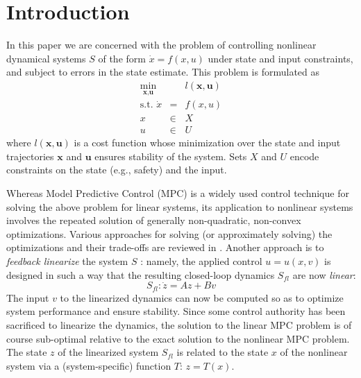 \section{Introduction}
\label{sec:intro}


In this paper we are concerned with the problem of controlling nonlinear dynamical systems $S$ of the form $\dot{x} = f(x,u)$ under state and input constraints, and subject to errors in the state estimate.
This problem is formulated as
\begin{eqnarray}
	\label{eq:generic NLMPC}
	\min_{\textbf{x},\textbf{u}} &\;& l(\textbf{x}, \textbf{u}) \\
	\text{s.t. } \dot{x}&=&f(x,u) \nonumber \\
	x&\in& X  \nonumber\\
	u&\in& U  \nonumber
\end{eqnarray}
where $l(\textbf{x}, \textbf{u})$ is a cost function whose minimization over the state and input trajectories $\textbf{x}$ and $\textbf{u}$ ensures stability of the system. 
Sets $X$ and $U$ encode constraints on the state (e.g., safety) and the input.

Whereas Model Predictive Control (MPC) is a widely used control technique for solving the above problem for linear systems, its application to nonlinear systems involves the repeated solution of generally non-quadratic, non-convex optimizations.
Various approaches for solving (or approximately solving) the optimizations and their trade-offs are reviewed in \cite{Cannon04_EfficientMPC}.
Another approach is to \emph{feedback linearize} the system $S$ \cite{khalil}: namely, the applied control $u = u(x,v)$ is designed in such a way that the resulting closed-loop dynamics $S_{fl}$ are now \emph{linear}:
	\[S_{fl}: \dot{z} = Az + Bv\]
The input $v$ to the linearized dynamics can now be computed so as to optimize system performance and ensure stability.
Since some control authority has been sacrificed to linearize the dynamics, the solution to the linear MPC problem is of course sub-optimal relative to the exact solution to the nonlinear MPC problem.
The state $z$ of the linearized system $S_{fl}$ is related to the state $x$ of the nonlinear system via a (system-specific) function $T$: $z=T(x)$.

